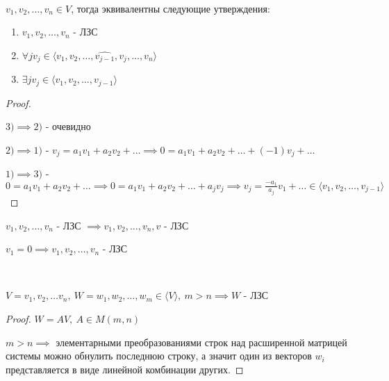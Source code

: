 \begin{theorem} ~

    $v_1, v_2, \ldots, v_n \in V$, тогда эквивалентны следующие утверждения:

    \begin{enumerate}
        \item $v_1, v_2, \ldots, v_n$ - ЛЗС
        \item $\forall j v_j \in \langle v_1, v_2, \ldots, \widehat{v_{j-1}}, v_j, \ldots, v_n \rangle$
        \item $\exists j v_j \in \langle v_1, v_2, \ldots, v_{j-1} \rangle$
    \end{enumerate}
    
\end{theorem}
\begin{proof}~

    $3) \implies 2)$ - очевидно

    $2) \implies 1)$ - $v_j = a_1v_1 + a_2v_2+\ldots \implies 0 = a_1v_1 + a_2v_2 + \ldots + (-1)v_j + \ldots$
    
    $1) \implies 3)$ - $0 = a_1v_1 + a_2v_2 + \ldots \implies 0 = a_1v_1 + a_2v_2 + \ldots + a_jv_j \implies v_j = \frac{-a_1}{a_j}v_1 + \ldots \in \langle v_1, v_2, \ldots, v_{j-1} \rangle$
    
\end{proof}

\begin{theorem-non}
    $v_1, v_2, \ldots, v_n$ - ЛЗС $\implies v_1, v_2, \ldots, v_n, v$ - ЛЗС 
\end{theorem-non}

\begin{follow}
    $v_1 = 0 \implies v_1, v_2, \ldots, v_n$ - ЛЗС
\end{follow}

\begin{theorem}~

    $V = v_1, v_2, \ldots v_n, ~ W = w_1, w_2, \ldots, w_m \in \langle V \rangle, ~ m > n \implies W$ - ЛЗС
\end{theorem}

\begin{proof}
    $W = A V, ~ A \in M(m, n)$

    $m > n \implies$ элементарными преобразованиями строк над расширенной матрицей системы можно обнулить последнюю строку, а значит один из векторов $w_i$ представляется в виде линейной комбинации других.
\end{proof}